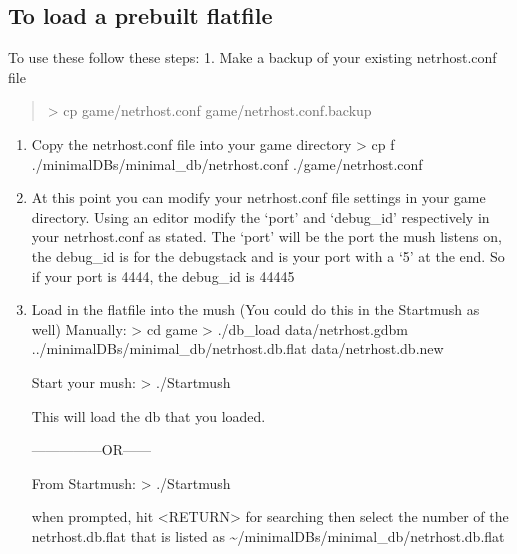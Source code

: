\documentclass[letterpaper,10pt,english]{sphinxmanual}
\begin{document}
\subsection{To load a prebuilt flatfile}
\label{\detokenize{24-quickinstall:to-load-a-prebuilt-flatfile}}
\sphinxAtStartPar
To use these follow these steps:
1.  Make a backup of your existing netrhost.conf file
\begin{quote}

\sphinxAtStartPar
\textendash{}\textgreater{} cp game/netrhost.conf game/netrhost.conf.backup
\end{quote}
\begin{enumerate}
%
\setcounter{enumi}{1}
\item {} 
\sphinxAtStartPar
Copy the netrhost.conf file into your game directory
\textendash{}\textgreater{} cp \sphinxhyphen{}f ./minimal\sphinxhyphen{}DBs/minimal\_db/netrhost.conf ./game/netrhost.conf

\item {} 
\sphinxAtStartPar
At this point you can modify your netrhost.conf file settings in your game directory.
Using an editor modify the ‘port’ and ‘debug\_id’ respectively in your netrhost.conf as stated.
The ‘port’ will be the port the mush listens on, the debug\_id is for the debug\sphinxhyphen{}stack and is
your port with a ‘5’ at the end.  So if your port is 4444, the debug\_id is 44445

\item {} 
\sphinxAtStartPar
Load in the flatfile into the mush (You could do this in the Startmush as well)
Manually:
\textendash{}\textgreater{} cd game
\textendash{}\textgreater{} ./db\_load data/netrhost.gdbm ../minimal\sphinxhyphen{}DBs/minimal\_db/netrhost.db.flat data/netrhost.db.new

\sphinxAtStartPar
Start your mush:
\textendash{}\textgreater{} ./Startmush

\sphinxAtStartPar
This will load the db that you loaded.

\sphinxAtStartPar
—————OR——\sphinxhyphen{}

\sphinxAtStartPar
From Startmush:
\textendash{}\textgreater{} ./Startmush

\sphinxAtStartPar
when prompted, hit \textless{}RETURN\textgreater{} for searching then select the number of the netrhost.db.flat that is
listed as \textasciitilde{}/minimal\sphinxhyphen{}DBs/minimal\_db/netrhost.db.flat

\end{enumerate}
\end{document}

